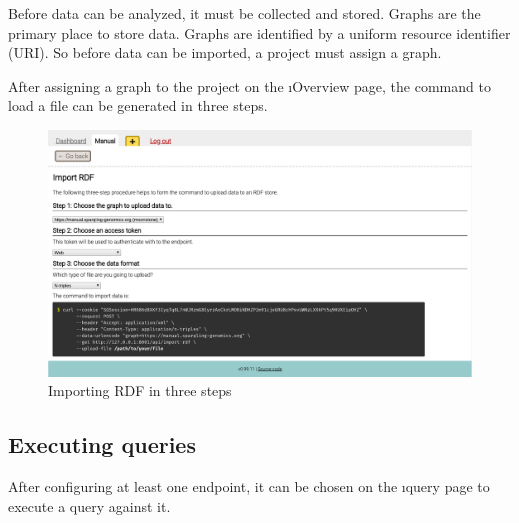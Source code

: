   Before data can be analyzed, it must be collected and stored.  Graphs are
  the primary place to store data.  Graphs are identified by a uniform resource
  identifier (URI).  So before data can be imported, a project must assign a
  graph.

  After assigning a graph to the project on the \i{Overview} page, the
  command to load a file can be generated in three steps.

  \begin{figure}[H]
    \begin{center}
      \includegraphics[width=1.0\textwidth]{figures/sg-web-import-rdf.pdf}
    \end{center}
    \caption{Importing RDF in three steps}
    \label{fig:web-import-rdf}
  \end{figure}

\subsection{Executing queries}

  After configuring at least one endpoint, it can be chosen on the \i{query}
  page to execute a query against it.

